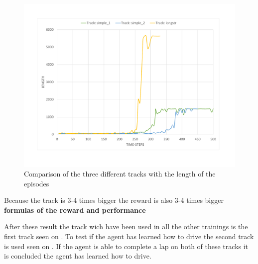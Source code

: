 \begin{figure}[H]
	\centering
	\includegraphics[width=1\textwidth]{Figures/Result/change_of_track_length_graph.pdf}
	\caption{Comparison of the three different tracks with the length of the episodes}
	\label{fig:change_of_track_length_graph}
\end{figure}

Because the track is 3-4 times bigger the reward is also 3-4 times bigger \textbf{formulas of the reward and performance}

After these result the track wich have been used in all the other trainings is the first track seen on . To test if the agent has learned how to drive the second track is used seen on . If the agent is able to complete a lap on both of these tracks it is concluded the agent has learned how to drive.   



